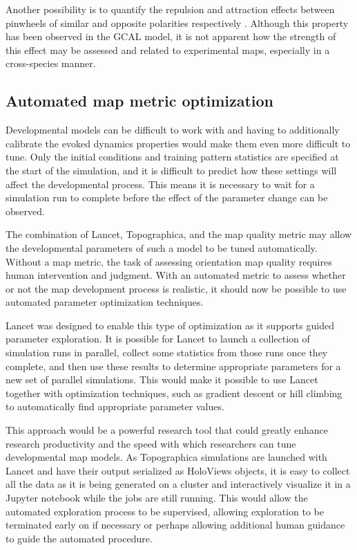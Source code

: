 \documentclass[phd,ianc,twoside]{infthesis}
\begin{document}
Another possibility is to quantify the repulsion and attraction effects
between pinwheels of similar and opposite polarities respectively
\citep{muller_nc00}. Although this property has been observed in the
GCAL model, it is not apparent how the strength of this effect may be
assessed and related to experimental maps, especially in a cross-species
manner.

\subsection{Automated map metric optimization}

Developmental models can be difficult to work with and having to
additionally calibrate the evoked dynamics properties would make them
even more difficult to tune. Only the initial
conditions and training pattern statistics are specified at the start of
the simulation, and it is difficult to predict how these settings will
affect the developmental process. This means it is necessary to wait for
a simulation run to complete before the effect of the parameter change
can be observed.

The combination of Lancet, Topographica, and the map quality metric may
allow the developmental parameters of such a model to be tuned
automatically. Without a map metric, the task of assessing
orientation map quality requires human intervention and judgment. With an automated
metric to assess whether or not the map development process is realistic, it
should now be possible to use automated parameter optimization
techniques.

Lancet was designed to enable this type of optimization as it supports
guided parameter exploration. It is possible for Lancet to launch a
collection of simulation runs in parallel, collect some statistics from
those runs once they complete, and then use these results to
determine appropriate parameters for a new set of parallel
simulations. This would make it possible to use Lancet together with
optimization techniques, such as gradient descent or hill climbing to
automatically find appropriate parameter values.

This approach would be a powerful research tool that could greatly enhance
research productivity and the speed with which researchers can tune
developmental map models. As Topographica simulations are launched with
Lancet and have their output serialized as HoloViews objects, it is easy to
collect all the data as it is being generated on a cluster and
interactively visualize it in a Jupyter notebook while the jobs are still running. This would allow the
automated exploration process to be supervised, allowing exploration to
be terminated early on if necessary or perhaps allowing additional human
guidance to guide the automated procedure.
\end{document}
